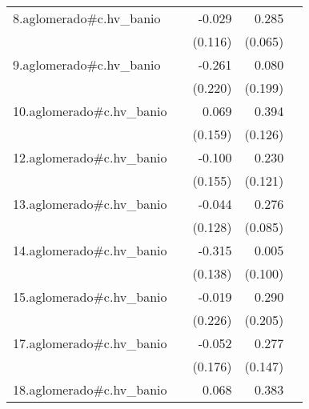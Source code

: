 {\begin{longtable}{l*{4}{D{.}{.}{-1}}}
\addlinespace
8.aglomerado#c.hv\_banio&                     &      -0.029         &       0.285\sym{***}&                     \\
            &                     &     (0.116)         &     (0.065)         &                     \\
\addlinespace
9.aglomerado#c.hv\_banio&                     &      -0.261         &       0.080         &                     \\
            &                     &     (0.220)         &     (0.199)         &                     \\
\addlinespace
10.aglomerado#c.hv\_banio&                     &       0.069         &       0.394\sym{**} &                     \\
            &                     &     (0.159)         &     (0.126)         &                     \\
\addlinespace
12.aglomerado#c.hv\_banio&                     &      -0.100         &       0.230         &                     \\
            &                     &     (0.155)         &     (0.121)         &                     \\
\addlinespace
13.aglomerado#c.hv\_banio&                     &      -0.044         &       0.276\sym{**} &                     \\
            &                     &     (0.128)         &     (0.085)         &                     \\
\addlinespace
14.aglomerado#c.hv\_banio&                     &      -0.315\sym{*}  &       0.005         &                     \\
            &                     &     (0.138)         &     (0.100)         &                     \\
\addlinespace
15.aglomerado#c.hv\_banio&                     &      -0.019         &       0.290         &                     \\
            &                     &     (0.226)         &     (0.205)         &                     \\
\addlinespace
17.aglomerado#c.hv\_banio&                     &      -0.052         &       0.277         &                     \\
            &                     &     (0.176)         &     (0.147)         &                     \\
\addlinespace
18.aglomerado#c.hv\_banio&                     &       0.068         &       0.383\sym{***}&                     \\

\end{longtable}}
